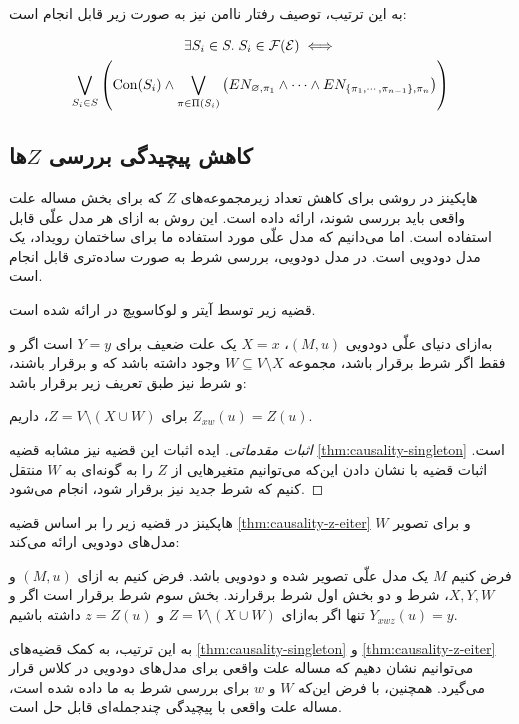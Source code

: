 به این ترتیب، توصیف رفتار ناامن نیز به صورت زیر قابل انجام است:

\begin{multline}\label{eq:unsafe-behavior-equiv-cm}
  \exists S_i \in S.\;S_i \in \operatorname{\mathcal{F}}(\mathcal{E}) \iff \\
  \bigvee_{S_i \in S} \left(
    \operatorname{Con}(S_i) \wedge
    \bigvee_{\pi \in \Pi(S_i)} \left(
      EN_{\varnothing, \pi_1} \wedge \cdots \wedge
      EN_{\left\{ \pi_1,\cdots,\pi_{n-1} \right\}, \pi_n}
    \right)
  \right)
\end{multline}

\subsection{کاهش پیچیدگی بررسی $Z$ها}
هاپکینز در
\cite{hopkins2002strategies}
روشی برای کاهش تعداد زیرمجموعه‌های
$Z$
که برای بخش
مساله علت واقعی باید بررسی شوند، ارائه داده است.
این روش به ازای هر مدل علّی قابل استفاده است.
اما می‌دانیم که مدل علّی مورد استفاده ما برای ساختمان رویداد،
یک مدل دودویی
است. در مدل دودویی، بررسی شرط
به صورت ساده‌تری قابل انجام است.

قضیه زیر توسط آیتر و لوکاسویچ در
\cite{eiter2001complexity}
ارائه شده است.

\begin{theorem}
  به‌ازای دنیای علّی دودویی
  $(M,u)$،
  $X=x$
  یک علت ضعیف برای
  $Y=y$
  است اگر و فقط اگر
  شرط
  برقرار باشد،
  مجموعه
  $W \subseteq V \setminus X$
  وجود داشته باشد که
   و 
  برقرار باشند، و شرط
  نیز طبق تعریف زیر برقرار باشد:
  
  \textbf{}
    برای
    $Z=V \setminus (X \cup W)$، داریم
    $Z_{xw}(u)=Z(u)$.
\end{theorem}

\begin{proof}[اثبات مقدماتی]\label{thm:causality-z-eiter}
  ایده اثبات این قضیه نیز مشابه قضیه
  \ref{thm:causality-singleton} است.
  اثبات قضیه با نشان دادن این‌که می‌توانیم متغیرهایی از
  $Z$
  را به گونه‌ای به
  $W$
  منتقل کنیم که شرط جدید نیز برقرار شود، انجام می‌شود.
\end{proof}

هاپکینز در
\cite{hopkins2002strategies}
قضیه زیر را بر اساس قضیه
\ref{thm:causality-z-eiter}
و برای
تصویر $W$
مدل‌های دودویی ارائه می‌کند:

\begin{theorem}\label{thm:causality-z-hopkins}
  فرض کنیم
  $M$
  یک مدل علّی تصویر شده و دودویی باشد.
  فرض کنیم به ازای
  $(M,u)$ و $X,Y,W$،
  شرط
   و دو بخش اول شرط 
  برقرارند. بخش سوم شرط
  برقرار است اگر و تنها اگر به‌ازای
  $Z=V \setminus (X \cup W)$ و $z=Z(u)$
  داشته باشیم
  $Y_{xwz}(u)=y$.
\end{theorem}

به این ترتیب، به کمک قضیه‌های
\ref{thm:causality-singleton} و \ref{thm:causality-z-eiter}
می‌توانیم نشان دهیم که
مساله علت واقعی برای مدل‌های دودویی در کلاس
قرار می‌گیرد. همچنین، با فرض این‌که
$W$ و $w$
برای بررسی شرط
به ما داده شده است، مساله علت واقعی
با پیچیدگی چندجمله‌ای قابل حل است.